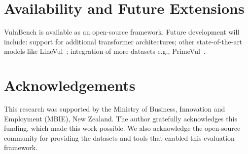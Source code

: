 \documentclass[letterpaper]{article}
\begin{document}
\section{Availability and Future Extensions}

VulnBench is available as an open-source framework. Future development will include: support for additional transformer architectures; other state-of-the-art models like LineVul~\citep{linevul2022}; integration of more datasets e.g., PrimeVul~\citep{ding2025vulnerability}.

\section*{Acknowledgements}
This research was supported by the Ministry of Business, Innovation and Employment (MBIE), New Zealand. The author gratefully acknowledges this funding, which made this work possible.
We also acknowledge the open-source community for providing the datasets and tools that enabled this evaluation framework.



\end{document}
